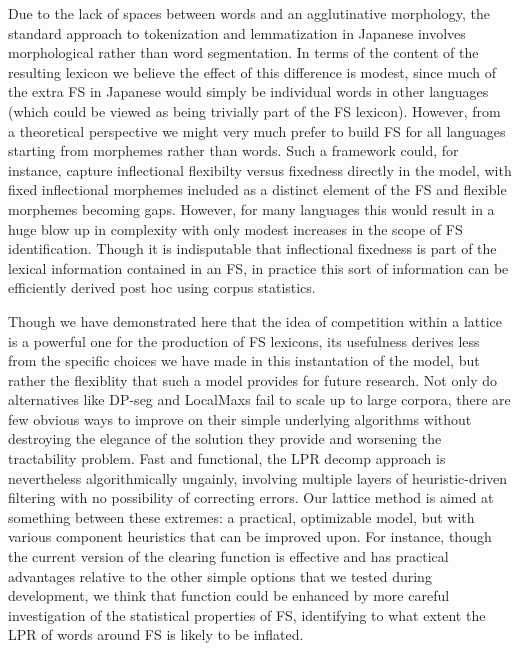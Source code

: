 \documentclass[11pt,letterpaper]{article}
\begin{document}
Due to the lack of spaces between words and an agglutinative morphology, the standard approach to tokenization and lemmatization in Japanese involves morphological rather than word segmentation. In terms of the content of the resulting lexicon we believe the effect of this difference is modest, since much of the extra FS in Japanese would simply be individual words in other languages (which could be viewed as being trivially part of the FS lexicon). However, from a theoretical perspective we might very much prefer to build FS for all languages starting from morphemes rather than words. Such a framework could, for instance, capture inflectional flexibilty versus fixedness directly in the model, with fixed inflectional morphemes included as a distinct element of the FS and flexible morphemes becoming gaps. However, for many languages this would result in a huge blow up in complexity with only modest increases in the scope of FS identification. Though it is indisputable that inflectional fixedness is part of the lexical information contained in an FS, in practice this sort of information can be efficiently derived post hoc using corpus statistics.

Though we have demonstrated here that the idea of competition within a lattice is a powerful one for the production of FS lexicons, its usefulness derives less from the specific choices we have made in this instantation of the model, but rather the flexiblity that such a model provides for future research. Not only do alternatives like DP-seg and LocalMaxs fail to scale up to large corpora, there are few obvious ways to improve on their simple underlying algorithms without destroying the elegance of the solution they provide and worsening the tractability problem. Fast and functional, the LPR decomp approach is nevertheless algorithmically ungainly, involving multiple layers of heuristic-driven filtering with no possibility of correcting errors. Our lattice method is aimed at something between these extremes: a practical, optimizable model, but with various component heuristics that can be improved upon. For instance, though the current version of the clearing function is effective and has practical advantages relative to the other simple options that we tested during development, we think that function could be enhanced by more careful investigation of the statistical properties of FS, identifying to what extent the LPR of words around FS is likely to be inflated.
\end{document}
